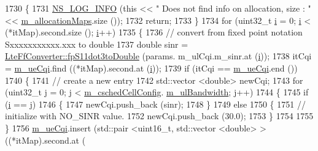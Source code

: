\begin{DoxyCode}
1730           \{
1731             \hyperlink{group__logging_gafbd73ee2cf9f26b319f49086d8e860fb}{NS\_LOG\_INFO} (\textcolor{keyword}{this} << \textcolor{stringliteral}{" Does not find info on allocation, size : "} << 
      \hyperlink{classns3_1_1RrFfMacScheduler_a9554a5b41b05461bdbcd12dcdecb34ea}{m\_allocationMaps}.size ());
1732             \textcolor{keywordflow}{return};
1733           \}
1734         \textcolor{keywordflow}{for} (uint32\_t \hyperlink{bernuolliDistribution_8m_a6f6ccfcf58b31cb6412107d9d5281426}{i} = 0; \hyperlink{bernuolliDistribution_8m_a6f6ccfcf58b31cb6412107d9d5281426}{i} < (*itMap).second.size (); \hyperlink{bernuolliDistribution_8m_a6f6ccfcf58b31cb6412107d9d5281426}{i}++)
1735           \{
1736             \textcolor{comment}{// convert from fixed point notation Sxxxxxxxxxxx.xxx to double}
1737             \textcolor{keywordtype}{double} sinr = \hyperlink{classns3_1_1LteFfConverter_aa5d8c2a8f988dbd63da91818c18666eb}{LteFfConverter::fpS11dot3toDouble} (params.
      m\_ulCqi.m\_sinr.at (\hyperlink{bernuolliDistribution_8m_a6f6ccfcf58b31cb6412107d9d5281426}{i}));
1738             itCqi = \hyperlink{classns3_1_1RrFfMacScheduler_aa19c6b6aafe91b47dbd96017fc913b40}{m\_ueCqi}.find ((*itMap).second.at (\hyperlink{bernuolliDistribution_8m_a6f6ccfcf58b31cb6412107d9d5281426}{i}));
1739             \textcolor{keywordflow}{if} (itCqi == \hyperlink{classns3_1_1RrFfMacScheduler_aa19c6b6aafe91b47dbd96017fc913b40}{m\_ueCqi}.end ())
1740               \{
1741                 \textcolor{comment}{// create a new entry}
1742                 std::vector <double> newCqi;
1743                 \textcolor{keywordflow}{for} (uint32\_t j = 0; j < \hyperlink{classns3_1_1RrFfMacScheduler_a809c6237863709f97fc450b1a2ba60d4}{m\_cschedCellConfig}.
      \hyperlink{structns3_1_1FfMacCschedSapProvider_1_1CschedCellConfigReqParameters_a5ab5b102878e6e7e7727a14af4a64d2f}{m\_ulBandwidth}; j++)
1744                   \{
1745                     \textcolor{keywordflow}{if} (\hyperlink{bernuolliDistribution_8m_a6f6ccfcf58b31cb6412107d9d5281426}{i} == j)
1746                       \{
1747                         newCqi.push\_back (sinr);
1748                       \}
1749                     \textcolor{keywordflow}{else}
1750                       \{
1751                         \textcolor{comment}{// initialize with NO\_SINR value.}
1752                         newCqi.push\_back (30.0);
1753                       \}
1754 
1755                   \}
1756                 \hyperlink{classns3_1_1RrFfMacScheduler_aa19c6b6aafe91b47dbd96017fc913b40}{m\_ueCqi}.insert (std::pair <uint16\_t, std::vector <double> > ((*itMap).second.at (

\end{DoxyCode}
